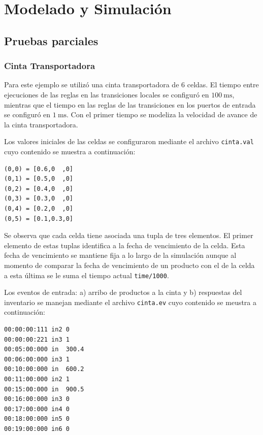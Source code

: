 \documentclass[10pt]{article}
\begin{document}
\section{Modelado y Simulación}
\subsection{Pruebas parciales}
\subsubsection{Cinta Transportadora}

Para este ejemplo se utilizó una cinta transportadora de $6$ celdas. El tiempo entre ejecuciones de las reglas en las transiciones locales se configuró en $100~\textrm{ms}$, mientras que el tiempo en las reglas de las transiciones en los puertos de entrada se configuró en $1~\textrm{ms}$. Con el primer tiempo se modeliza la velocidad de avance de la cinta transportadora.

Los valores iniciales de las celdas se configuraron mediante el archivo \texttt{cinta.val} cuyo contenido se muestra a continuación:

\begin{minipage}{1\textwidth}
	\centering
	\begin{lstlisting}
(0,0) = [0.6,0  ,0]
(0,1) = [0.5,0  ,0]
(0,2) = [0.4,0  ,0]
(0,3) = [0.3,0  ,0]
(0,4) = [0.2,0  ,0]
(0,5) = [0.1,0.3,0]
	\end{lstlisting}
\end{minipage}

Se observa que cada celda tiene asociada una tupla de tres elementos. El primer elemento de estas tuplas identifica a la fecha de vencimiento de la celda. Esta fecha de vencimiento se mantiene fija a lo largo de la simulación aunque al momento de comparar la fecha de vencimiento de un producto con el de la celda a esta última se le suma el tiempo actual \texttt{time/1000}.

Los eventos de entrada: a) arribo de productos a la cinta y b) respuestas del inventario se manejan mediante el archivo \texttt{cinta.ev} cuyo contenido se meustra a continuación:

\begin{minipage}{1\textwidth}
	\centering
	\begin{lstlisting}
00:00:00:111 in2 0
00:00:00:221 in3 1
00:05:00:000 in  300.4
00:06:00:000 in3 1
00:10:00:000 in  600.2
00:11:00:000 in2 1
00:15:00:000 in  900.5
00:16:00:000 in3 0
00:17:00:000 in4 0
00:18:00:000 in5 0
00:19:00:000 in6 0
	\end{lstlisting}	
\end{minipage}
\end{document}
